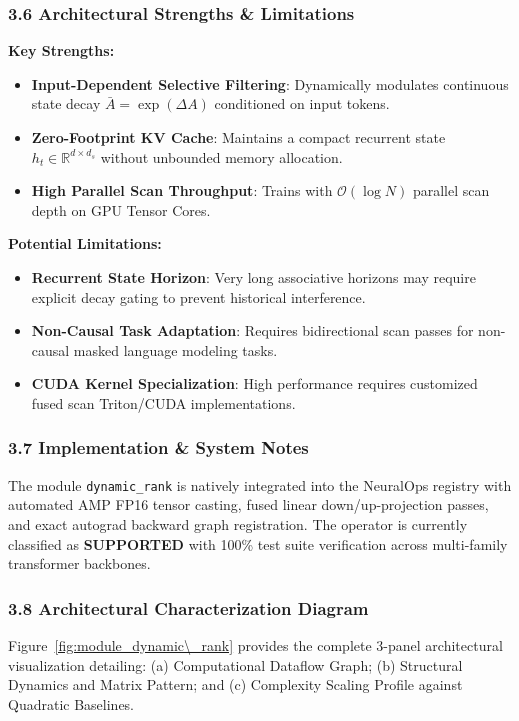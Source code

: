 \subsubsection*{3.6 Architectural Strengths \& Limitations}
\textbf{Key Strengths:}
\begin{itemize}
    \item \textbf{Input-Dependent Selective Filtering}: Dynamically modulates continuous state decay $\bar{A} = \exp(\Delta A)$ conditioned on input tokens.
    \item \textbf{Zero-Footprint KV Cache}: Maintains a compact recurrent state $h_t \in \mathbb{R}^{d \times d_s}$ without unbounded memory allocation.
    \item \textbf{High Parallel Scan Throughput}: Trains with $\mathcal{O}(\log N)$ parallel scan depth on GPU Tensor Cores.
\end{itemize}

\textbf{Potential Limitations:}
\begin{itemize}
    \item \textbf{Recurrent State Horizon}: Very long associative horizons may require explicit decay gating to prevent historical interference.
    \item \textbf{Non-Causal Task Adaptation}: Requires bidirectional scan passes for non-causal masked language modeling tasks.
    \item \textbf{CUDA Kernel Specialization}: High performance requires customized fused scan Triton/CUDA implementations.
\end{itemize}

\subsubsection*{3.7 Implementation \& System Notes}
The module \texttt{dynamic\_rank} is natively integrated into the NeuralOps registry with automated AMP FP16 tensor casting, fused linear down/up-projection passes, and exact autograd backward graph registration. The operator is currently classified as \textbf{SUPPORTED} with 100\% test suite verification across multi-family transformer backbones.

\subsubsection*{3.8 Architectural Characterization Diagram}
Figure~\ref{fig:module_dynamic\_rank} provides the complete 3-panel architectural visualization detailing: (a) Computational Dataflow Graph; (b) Structural Dynamics and Matrix Pattern; and (c) Complexity Scaling Profile against Quadratic Baselines.

